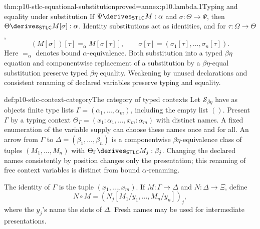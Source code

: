\begin{hbtheorem}{thm:p10-stlc-equational-substitution}{proved=annex:p10.lambda.1}{Typing and equality under substitution}
If \(\Psi\derives_{\mathsf{STLC}}M:\alpha\) and
\(\sigma:\Theta\to\Psi\), then
\(\Theta\derives_{\mathsf{STLC}}M[\sigma]:\alpha\).
Identity substitutions act as identities, and for
\(\tau:\Omega\to\Theta\),
\[
 (M[\sigma])[\tau]=_{\alpha}M[\sigma[\tau]],
 \qquad
 \sigma[\tau]=(\sigma_1[\tau],\ldots,\sigma_n[\tau]).
\]
Here \(=_{\alpha}\) denotes bound \(\alpha\)-equivalence.
Both substitution into a typed \(\beta\eta\) equation and
componentwise replacement of a substitution by a
\(\beta\eta\)-equal substitution preserve typed \(\beta\eta\)
equality.  Weakening by unused declarations and consistent
renaming of declared variables preserve typing and equality.
\end{hbtheorem}

\begin{hbdefinition}{def:p10-stlc-context-category}{The category of typed contexts}
Let \(\mathcal S_{\beta\eta}\) have as objects finite type lists
\(\Gamma=(\alpha_1,\ldots,\alpha_m)\), including the empty list
\(()\).  Present \(\Gamma\) by a typing context
\(\Theta_\Gamma=(x_1{:}\alpha_1,\ldots,x_m{:}\alpha_m)\)
with distinct names.  A fixed enumeration of the variable supply
can choose these names once and for all.
An arrow from \(\Gamma\) to
\(\Delta=(\beta_1,\ldots,\beta_n)\) is a componentwise
\(\beta\eta\)-equivalence class of tuples \((M_1,\ldots,M_n)\)
with \(\Theta_\Gamma\derives_{\mathsf{STLC}}M_j:\beta_j\).
Changing the declared names consistently by position changes
only the presentation; this renaming of free context variables
is distinct from bound \(\alpha\)-renaming.

The identity of \(\Gamma\) is the tuple \((x_1,\ldots,x_m)\).
If \(M:\Gamma\to\Delta\) and \(N:\Delta\to\Xi\), define
\[
                 N\circ M=(N_j[M_1/y_1,\ldots,M_n/y_n])_j,
\]
where the \(y_j\)'s name the slots of \(\Delta\).
Fresh names may be used for intermediate presentations.
\end{hbdefinition}

